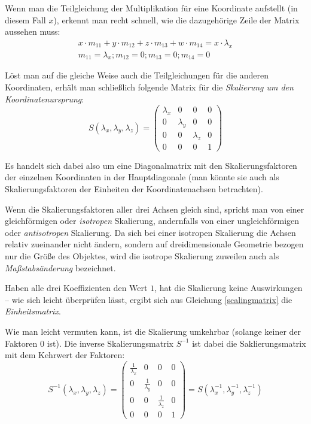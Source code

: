 Wenn man die Teilgleichung der Multiplikation für eine Koordinate aufstellt (in diesem Fall $x$), erkennt man recht schnell, wie die dazugehörige Zeile der Matrix aussehen muss:
\begin{equation}
\begin{split}
 x \cdot m_{11} + y \cdot m_{12} + z \cdot m_{13} + w \cdot m_{14} = x \cdot \lambda_x \\
 m_{11} = \lambda_x; m_{12} = 0; m_{13} = 0; m_{14} = 0
\end{split}
\end{equation}

Löst man auf die gleiche Weise auch die Teilgleichungen für die anderen Koordinaten, erhält man schließlich folgende Matrix für die \emph{Skalierung um den Koordinatenursprung}:
\begin{equation}
\label{scalingmatrix}
 S{(\lambda_x, \lambda_y, \lambda_z)} =
 \begin{pmatrix}
  \lambda_x & 0 & 0 & 0 \\
  0 & \lambda_y & 0 & 0 \\
  0 & 0 & \lambda_z & 0 \\
  0 & 0 & 0 & 1
 \end{pmatrix}
\end{equation}

Es handelt sich dabei also um eine Diagonalmatrix mit den Skalierungsfaktoren der einzelnen Koordinaten in der Hauptdiagonale (man könnte sie auch als Skalierungsfaktoren der Einheiten der Koordinatenachsen betrachten).

Wenn die Skalierungsfaktoren aller drei Achsen gleich sind, spricht man von einer gleichförmigen oder \emph{isotropen} Skalierung, andernfalls von einer ungleichförmigen oder \emph{antisotropen} Skalierung. Da sich bei einer isotropen Skalierung die Achsen relativ zueinander nicht ändern, sondern auf dreidimensionale Geometrie bezogen nur die Größe des Objektes, wird die isotrope Skalierung zuweilen auch als \emph{Maßstabsänderung} bezeichnet.

Haben alle drei Koeffizienten den Wert $1$, hat die Skalierung keine Auswirkungen -- wie sich leicht überprüfen lässt, ergibt sich aus Gleichung \ref{scalingmatrix} die \emph{Einheitsmatrix}.

Wie man leicht vermuten kann, ist die Skalierung umkehrbar (solange keiner der Faktoren 0 ist). Die inverse Skalierungsmatrix $S^{-1}$ ist dabei die Saklierungsmatrix mit dem Kehrwert der Faktoren:
\begin{equation}
 S^{-1}{(\lambda_x, \lambda_y, \lambda_z)} =
 \begin{pmatrix}
  \frac{1}{\lambda_x} & 0 & 0 & 0 \\
  0 & \frac{1}{\lambda_y} & 0 & 0 \\
  0 & 0 & \frac{1}{\lambda_z} & 0 \\
  0 & 0 & 0 & 1
 \end{pmatrix}
 = S{(\lambda_x^{-1}, \lambda_y^{-1}, \lambda_z^{-1})}
\end{equation}


